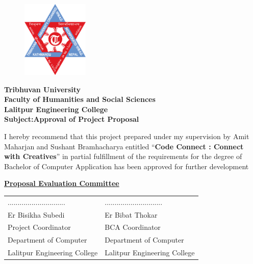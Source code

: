 \documentclass{report}
\begin{document}
\begin{figure}
	\centering
	\includegraphics[width=1.25in]{tu.png}
\end{figure}
\begin{center}
	{\fontsize{14pt}{18}\selectfont
		\textbf{Tribhuvan University\\
			Faculty of Humanities and Social Sciences\\
			Lalitpur Engineering College\\
			\vspace{0.75in}
			{\fontsize{12pt}{18}\selectfont
				Subject:Approval of Project Proposal\\
			}
			\vspace{0.5in}}}
\end{center}
\justify
I hereby recommend that this project prepared under my supervision by Amit Maharjan and Sushant Bramhacharya entitled “\textbf{Code Connect : Connect with Creatives}” in partial fulfillment of the
requirements for the degree of Bachelor of Computer Application has been approved for further development\\
\begin{center}
	{\fontsize{12pt}{18}\selectfont
		\vspace{0.5in}
		\textbf{\underline{Proposal Evaluation Committee}}\\
		\vspace{0.75in}
		\begin{table}[h]
			\centering
			\begin{tabular}{l l}
				.............................\hspace{2in} & ............................. \\
				Er Bisikha Subedi                         & Er Bibat Thokar               \\
				Project Coordinator                       & BCA Coordinator               \\
				Department of Computer                    & Department of Computer        \\
				Lalitpur Engineering College              & Lalitpur Engineering College
			\end{tabular}
		\end{table}

	}
\end{center}
\end{document}
